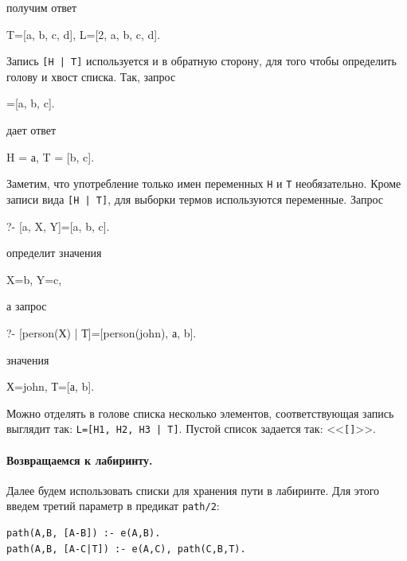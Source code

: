 \documentclass[a4paper,14pt, openany, twoside, draft]{extbook} %
\begin{document}
\noindent получим ответ

\begin{proexp}
T=[a, b, c, d], L=[2, a, b, c, d].
\end{proexp}

  Запись {\tt [Н | Т]} используется и в обратную сторону, для того чтобы определить голову и хвост списка.  Так, запрос

\begin{proexp}
[H | T]=[a, b, c].
\end{proexp}

\noindent дает ответ

\begin{proexp}
H = а, T = [b, c].
\end{proexp}


Заметим, что употребление только имен переменных {\tt Н} и {\tt Т} необязательно.  Кроме записи вида {\tt [H | T]}, для выборки термов используются переменные. Запрос

\begin{proexp}
?- [a, X, Y]=[a, b, c].
\end{proexp}

\noindent определит значения

\begin{proexp}
X=b, Y=c,
\end{proexp}

\noindent а запрос

\begin{proexp}
?- [person(Х) | Т]=[person(john), а, b].
\end{proexp}

\noindent значения

\begin{proexp}
Х=john, Т=[а, b].
\end{proexp}

  Можно отделять в голове списка несколько элементов, соответствующая запись выглядит так: {\tt L=[H1, H2, H3 | T]}.  Пустой список задается так: <<\texttt{[]}>>.

\paragraph{Возвращаемся к лабиринту.} \label{par:mazelist} Далее будем использовать списки для хранения пути в лабиринте.  Для этого введем третий параметр в предикат \texttt{path/2}:

\begin{verbatim}
path(A,B, [A-B]) :- e(A,B).
path(A,B, [A-C|T]) :- e(A,C), path(C,B,T).
\end{verbatim}
\end{document}

